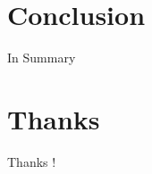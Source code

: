 \documentclass{beamer}
\begin{document}
\section{Conclusion}
\begin{frame}{In Summary}

\end{frame}
%
\section*{Thanks}
\begin{frame}
\begin{LARGE}
\begin{center}
Thanks !
\end{center}
\end{LARGE}
\end{frame}
\end{document}
